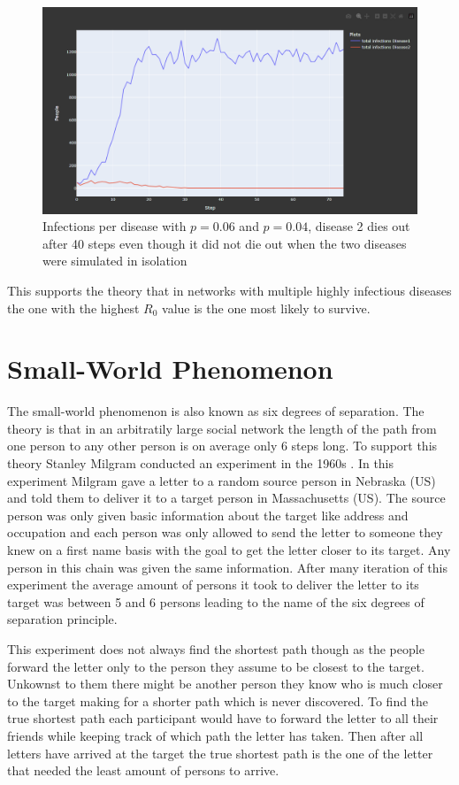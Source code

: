 \begin{figure}
    \centering
    \includegraphics[width=0.5\linewidth]{images/exp_multiple_diseases_both.png}
    \caption{Infections per disease with $p = 0.06$ and $p = 0.04$, disease 2 dies out after 40 steps even though it did not die out when the two diseases were simulated in isolation}
    \label{fig:exp_multiple_diseases}
\end{figure}

This supports the theory that in networks with multiple highly infectious diseases the one with the highest $R_0$ value is the one most likely to survive.

\section{Small-World Phenomenon}
The small-world phenomenon is also known as six degrees of separation. The theory is that in an arbitratily large social network the length of the path from one person to any other person is on average only 6 steps long. To support this theory Stanley Milgram conducted an experiment in the 1960s \cite{smallWorld}. In this experiment Milgram gave a letter to a random source person in Nebraska (US) and told them to deliver it to a target person in Massachusetts (US). The source person was only given basic information about the target like address and occupation and each person was only allowed to send the letter to someone they knew on a first name basis with the goal to get the letter closer to its target. Any person in this chain was given the same information. After many iteration of this experiment the average amount of persons it took to deliver the letter to its target was between 5 and 6 persons leading to the name of the six degrees of separation principle.

This experiment does not always find the shortest path though as the people forward the letter only to the person they assume to be closest to the target. Unkownst to them there might be another person they know who is much closer to the target making for a shorter path which is never discovered. To find the true shortest path each participant would have to forward the letter to all their friends while keeping track of which path the letter has taken. Then after all letters have arrived at the target the true shortest path is the one of the letter that needed the least amount of persons to arrive.

